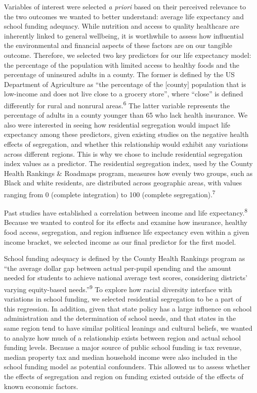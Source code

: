 \documentclass[
  10pt,
  letterpaper,
  DIV=11,
  numbers=noendperiod]{scrartcl}
\begin{document}
Variables of interest were selected \emph{a priori} based on their
perceived relevance to the two outcomes we wanted to better understand:
average life expectancy and school funding adequacy. While nutrition and
access to quality healthcare are inherently linked to general wellbeing,
it is worthwhile to assess how influential the environmental and
financial aspects of these factors are on our tangible outcome.
Therefore, we selected two key predictors for our life expectancy model:
the percentage of the population with limited access to healthy foods
and the percentage of uninsured adults in a county. The former is
defined by the US Department of Agriculture as ``the percentage of the
{[}county{]} population that is low-income and does not live close to a
grocery store'', where ``close'' is defined differently for rural and
nonrural areas.\textsuperscript{6} The latter variable represents the
percentage of adults in a county younger than 65 who lack health
insurance. We also were interested in seeing how residential segregation
would impact life expectancy among these predictors, given existing
studies on the negative health effects of segregation, and whether this
relationship would exhibit any variations across different regions. This
is why we chose to include residential segregation index values as a
predictor. The residential segregation index, used by the County Health
Rankings \& Roadmaps program, measures how evenly two groups, such as
Black and white residents, are distributed across geographic areas, with
values ranging from 0 (complete integration) to 100 (complete
segregation).\textsuperscript{7}~

Past studies have established a correlation between income and life
expectancy.\textsuperscript{8} Because we wanted to control for its
effects and examine how insurance, healthy food access, segregation, and
region influence life expectancy even within a given income bracket, we
selected income as our final predictor for the first model.

School funding adequacy is defined by the County Health Rankings program
as ``the average dollar gap between actual per-pupil spending and the
amount needed for students to achieve national average test scores,
considering districts' varying equity-based needs.''\textsuperscript{9}
To explore how racial diversity interface with variations in school
funding, we selected residential segregation to be a part of this
regression. In addition, given that state policy has a large influence
on school administration and the determination of school needs, and that
states in the same region tend to have similar political leanings and
cultural beliefs, we wanted to analyze how much of a relationship exists
between region and actual school funding levels. Because a major source
of public school funding is tax revenue, median property tax and median
household income were also included in the school funding model as
potential confounders. This allowed us to assess whether the effects of
segregation and region on funding existed outside of the effects of
known economic factors.
\end{document}
